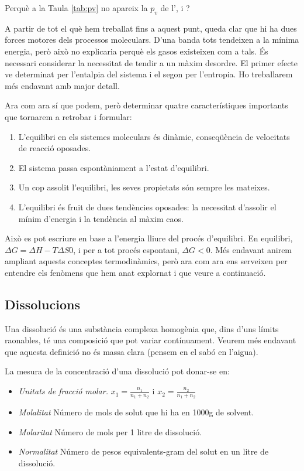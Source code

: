 \begin{exr}
Perquè a la Taula \ref{tab:pv} no apareix la $p_v$ de l',  i ?
\end{exr}

A partir de tot el què hem treballat fins a aquest punt, queda clar que hi ha dues forces motores dels processos moleculars. D'una banda tots tendeixen a la mínima energia, però això no explicaria perquè els gasos existeixen com a tals. És necessari considerar la necessitat de tendir a un màxim desordre. El primer efecte ve determinat per l'entalpia del sistema i el segon per l'entropia. Ho treballarem més endavant amb major detall.

Ara com ara sí que podem, però determinar quatre característiques importants que tornarem a retrobar i formular:
\begin{enumerate}
\item L'equilibri en els sistemes moleculars és dinàmic, conseqüència de velocitats de reacció oposades.
\item El sistema passa espontàniament a l'estat d'equilibri.
\item Un cop assolit l'equilibri, les seves propietats són sempre les mateixes.
\item L'equilibri és fruit de dues tendències oposades: la necessitat d'assolir el mínim d'energia i la tendència al màxim caos.
\end{enumerate}

Això es pot escriure en base a l'energia lliure del procés d'equilibri. En equilibri, $\Delta G=\Delta H - T\Delta S0$, i per a tot procés espontani, $\Delta G <0$.
Més endavant anirem ampliant aquests conceptes termodinàmics, però ara com ara ens serveixen per entendre els fenòmens que hem anat explornat i que veure a continuació.

\subsection{Dissolucions}

Una dissolució és una substància complexa homogènia que, dins d'uns límits raonables, té una composició que pot variar contínuament.
Veurem més endavant que aquesta definició no és massa clara (pensem en el sabó en l'aigua).

La mesura de la concentració d'una dissolució pot donar-se en:
\begin{itemize}
\item \emph{Unitats de fracció molar.} $x_1=\frac{n_1}{n_1+n_2}$ i $x_2=\frac{n_2}{n_1+n_2}$
\item \emph{Molalitat} Número de mols de solut que hi ha en 1000g de solvent.
\item \emph{Molaritat} Número de mols per 1 litre de dissolució.
\item \emph{Normalitat} Número de pesos equivalents-gram del solut en un litre de dissolució.
\end{itemize}
